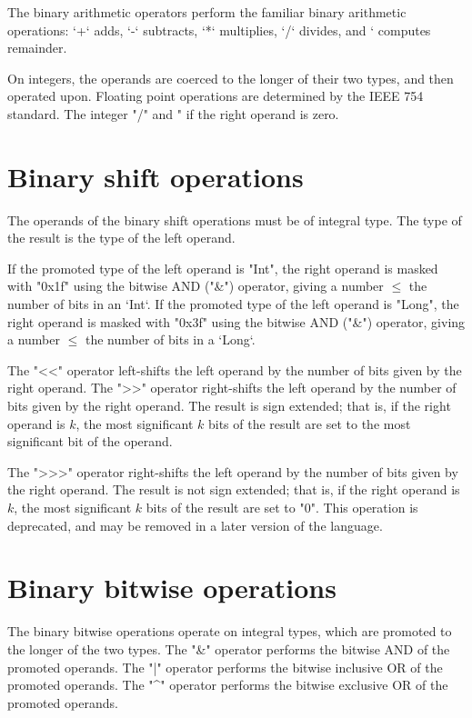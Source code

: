 The binary arithmetic operators perform the familiar binary arithmetic
operations: \xcd`+` adds, \xcd`-` subtracts, \xcd`*` multiplies, 
\xcd`/` divides, and \xcd`%
computes remainder.

On integers, the operands are coerced to the longer of their two types, and
then operated upon.  
Floating point operations are determined by the IEEE 754
standard. 
The integer \xcd"/" and \xcd"%
if the right operand is zero.

\section{Binary shift operations}

The operands of the binary shift operations must be of integral type.
The type of the result is the type of the left operand.

If the promoted type of the left operand is \xcd"Int",
the right operand is masked with \xcd"0x1f" using the bitwise
AND (\xcd"&") operator, giving a number {$\le$} the number of bits in an
\xcd`Int`. 
If the promoted type of the left operand is \xcd"Long",
the right operand is masked with \xcd"0x3f" using the bitwise
AND (\xcd"&") operator, giving a number {$\le$} the number of bits in a
\xcd`Long`. 

The \xcd"<<" operator left-shifts the left operand by the number of
bits given by the right operand.
The \xcd">>" operator right-shifts the left operand by the number of
bits given by the right operand.  The result is sign extended;
that is, if the right operand is $k$,
the most significant $k$ bits of the result are set to the most
significant bit of the operand.

The \xcd">>>" operator right-shifts the left operand by the number of
bits given by the right operand.  The result is not sign extended;
that is, if the right operand is $k$,
the most significant $k$ bits of the result are set to \xcd"0".
This operation is deprecated, and may be removed in a later version of the
language. 

\section{Binary bitwise operations}

The binary bitwise operations operate on integral types, which are promoted to
the longer of the two types.
The \xcd"&" operator  performs the bitwise AND of the promoted operands.
The \xcd"|" operator  performs the bitwise inclusive OR of the promoted operands.
The \xcd"^" operator  performs the bitwise exclusive OR of the promoted operands.

